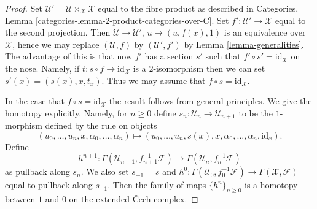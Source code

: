 \documentclass[10pt,a4paper]{amsart}
\theoremstyle{plain}
\theoremstyle{definition}
\theoremstyle{remark}
\numberwithin{equation}{subsection}
\begin{document}
\begin{proof}
Set $\mathcal{U}' = \mathcal{U} \times_\mathcal{X} \mathcal{X}$
equal to the fibre product as described in
Categories, Lemma \ref{categories-lemma-2-product-categories-over-C}.
Set $f' : \mathcal{U}' \to \mathcal{X}$ equal to the second projection.
Then $\mathcal{U} \to \mathcal{U}'$, $u \mapsto (u, f(x), 1)$
is an equivalence over $\mathcal{X}$, hence we may replace
$(\mathcal{U}, f)$ by $(\mathcal{U}', f')$ by
Lemma \ref{lemma-generalities}.
The advantage of this is that now $f'$ has a section $s'$ such
that $f' \circ s' = \text{id}_\mathcal{X}$ on the nose. Namely, if
$t : s \circ f \to \text{id}_\mathcal{X}$ is a $2$-isomorphism
then we can set $s'(x) = (s(x), x, t_x)$. Thus we may assume that
$f \circ s = \text{id}_\mathcal{X}$.

\medskip\noindent
In the case that $f \circ s = \text{id}_\mathcal{X}$ the result follows
from general principles. We give the homotopy explicitly. Namely,
for $n \geq 0$ define $s_n : \mathcal{U}_n \to \mathcal{U}_{n + 1}$
to be the $1$-morphism defined by the rule on objects
$$
(u_0, \ldots, u_n, x, \alpha_0, \ldots, \alpha_n)
\longmapsto
(u_0, \ldots, u_n, s(x), x,
\alpha_0, \ldots, \alpha_n, \text{id}_x).
$$
Define
$$
h^{n + 1} :
\Gamma(\mathcal{U}_{n + 1}, f_{n + 1}^{-1}\mathcal{F})
\longrightarrow
\Gamma(\mathcal{U}_n, f_n^{-1}\mathcal{F})
$$
as pullback along $s_n$. We also set $s_{-1} = s$ and
$h^0 : \Gamma(\mathcal{U}_0, f_0^{-1}\mathcal{F}) \to
\Gamma(\mathcal{X}, \mathcal{F})$ equal to pullback along $s_{-1}$.
Then the family of maps $\{h^n\}_{n \geq 0}$ is a homotopy between
$1$ and $0$ on the extended {\v C}ech complex.
\end{proof}
\end{document}
